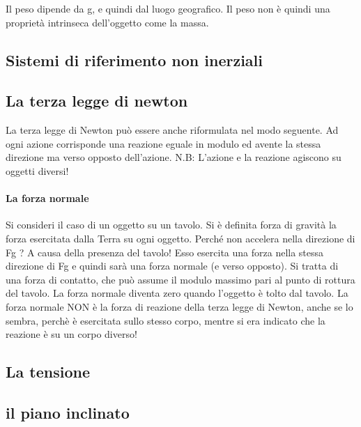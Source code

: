 \documentclass[12pt, a4paper, openany]{book}
\begin{document}
Il peso dipende da g, e quindi dal luogo geografico. Il peso non è quindi una proprietà intrinseca
dell’oggetto come la massa.
\subsection*{Sistemi di riferimento non inerziali}
\subsection{La terza legge di newton}
La terza legge di Newton può essere anche riformulata nel modo seguente.
Ad ogni azione corrisponde una reazione eguale in modulo ed avente la stessa direzione ma
verso opposto dell’azione.
N.B: L’azione e la reazione agiscono su oggetti diversi!

\paragraph*{La forza normale}
Si consideri il caso di un oggetto su un tavolo. Si è definita forza di gravità la forza esercitata dalla Terra su
ogni oggetto. Perché non accelera nella direzione di Fg ? A causa della presenza del tavolo!
Esso esercita una forza nella stessa direzione di Fg e quindi sarà una forza normale (e verso opposto). Si
tratta di una forza di contatto, che può assume il modulo massimo pari al punto di rottura del tavolo. La
forza normale diventa zero quando l'oggetto è tolto dal tavolo.
La forza normale NON è la forza di reazione della terza legge di Newton, anche se lo sembra,
perchè è esercitata sullo stesso corpo, mentre si era indicato che la reazione è su un corpo
diverso!

\subsection*{La tensione}

\subsection{il piano inclinato}


\end{document}
